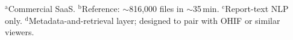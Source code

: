 \documentclass[11pt]{article}
\begin{document}
\begin{table}[ht]
\vspace{2pt}
{\footnotesize
$^{\mathrm{a}}$Commercial SaaS.\quad
$^{\mathrm{b}}$Reference: ${\sim}$816{,}000 files in ${\sim}$35\,min.\quad
$^{\mathrm{c}}$Report-text NLP only.\quad
$^{\mathrm{d}}$Metadata-and-retrieval layer; designed to pair with OHIF or
similar viewers.}
\end{table}



\end{document}

